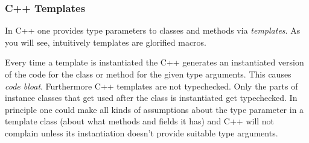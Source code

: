 \documentclass{article}
\begin{document}
\subsubsection{C++ Templates}

In C++ one provides type parameters to classes and methods via \textit{templates}. As you will see, intuitively templates are glorified macros.

Every time a template is instantiated the C++ generates an instantiated version of the code for the class or method for the given type arguments. This causes \textit{code bloat}. Furthermore C++ templates are not typechecked. Only the parts of instance classes that get used after the class is instantiated get typechecked. In principle one could make all kinds of assumptions about the type parameter in a template class (about what methods and fields it has) and C++ will not complain unless its instantiation doesn't provide suitable type arguments.
\end{document}
